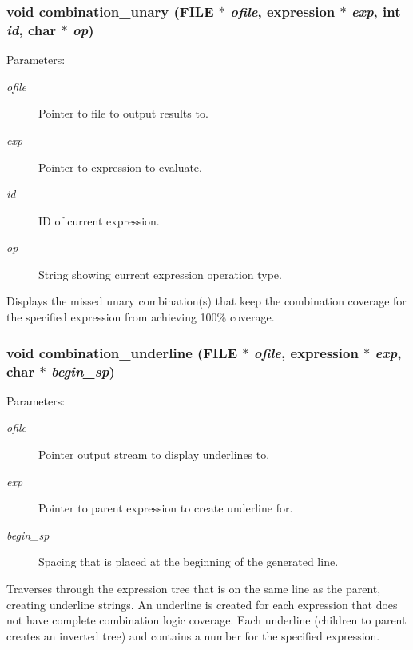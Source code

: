 \subsubsection{\setlength{\rightskip}{0pt plus 5cm}void combination\_\-unary (FILE $\ast$ {\em ofile}, {\bf expression} $\ast$ {\em exp}, int {\em id}, char $\ast$ {\em op})}\label{comb_8c_a14}


\begin{Desc}
\item[Parameters: ]\par
\begin{description}
\item[{\em 
ofile}]Pointer to file to output results to. \item[{\em 
exp}]Pointer to expression to evaluate. \item[{\em 
id}]ID of current expression. \item[{\em 
op}]String showing current expression operation type.\end{description}
\end{Desc}
Displays the missed unary combination(s) that keep the combination coverage for the specified expression from achieving 100\% coverage. 
\subsubsection{\setlength{\rightskip}{0pt plus 5cm}void combination\_\-underline (FILE $\ast$ {\em ofile}, {\bf expression} $\ast$ {\em exp}, char $\ast$ {\em begin\_\-sp})}\label{comb_8c_a13}


\begin{Desc}
\item[Parameters: ]\par
\begin{description}
\item[{\em 
ofile}]Pointer output stream to display underlines to. \item[{\em 
exp}]Pointer to parent expression to create underline for. \item[{\em 
begin\_\-sp}]Spacing that is placed at the beginning of the generated line.\end{description}
\end{Desc}
Traverses through the expression tree that is on the same line as the parent, creating underline strings. An underline is created for each expression that does not have complete combination logic coverage. Each underline (children to parent creates an inverted tree) and contains a number for the specified expression. 
